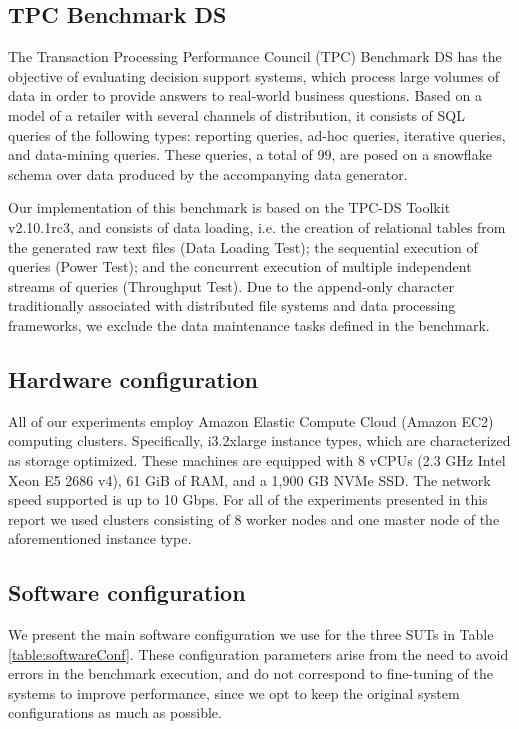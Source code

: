 \subsection{TPC Benchmark DS}

The Transaction Processing Performance Council (TPC) Benchmark DS \cite{tpcdsSpec} has the objective of evaluating decision support systems, which process large volumes of data in order to provide answers to real-world business questions. Based on a model of a retailer with several channels of distribution, it consists of SQL queries of the following types: reporting queries, ad-hoc queries, iterative queries, and data-mining queries. These queries, a total of 99, are posed on a snowflake schema over data produced by the accompanying data generator.

Our implementation of this benchmark is based on the TPC-DS Toolkit v2.10.1rc3, and consists of data loading, i.e. the creation of relational tables from the generated raw text files (Data Loading Test); the sequential execution of queries (Power Test); and the concurrent execution of multiple independent streams of queries (Throughput Test). Due to the append-only character traditionally associated with distributed file systems and data processing frameworks, we exclude the data maintenance tasks defined in the benchmark.

\subsection{Hardware configuration}

All of our experiments employ Amazon Elastic Compute Cloud (Amazon EC2) computing clusters. Specifically, i3.2xlarge instance types, which are characterized as storage optimized. These machines are equipped with 8 vCPUs (2.3 GHz Intel Xeon E5 2686 v4), 61 GiB of RAM, and a 1,900 GB NVMe SSD. The network speed supported is up to 10 Gbps. For all of the experiments presented in this report we used clusters consisting of 8 worker nodes and one master node of the aforementioned instance type.

\subsection{Software configuration}

We present the main software configuration we use for the three SUTs in Table \ref{table:softwareConf}. These configuration parameters arise from the need to avoid errors in the benchmark execution, and do not correspond to fine-tuning of the systems to improve performance, since we opt to keep the original system configurations as much as possible.

